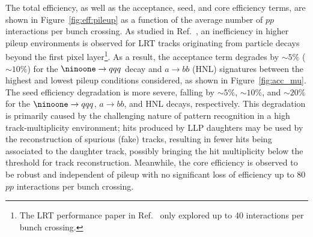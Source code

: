 \documentclass[PUB,UKenglish, texlive=2018]{\ATLASLATEXPATH atlasdoc}
\begin{document}
The total efficiency, as well as the acceptance, seed, and core efficiency terms, are shown in Figure~\ref{fig:eff:pileup} as a function of the average number of $pp$ interactions per bunch crossing.
As studied in Ref.~\cite{ATL-PHYS-PUB-2017-014}, an inefficiency in higher pileup environments is observed for LRT tracks originating from particle decays beyond the first pixel layer\footnote{The 
LRT performance paper in Ref.~\cite{ATL-PHYS-PUB-2017-014} only explored up to 40 interactions per bunch crossing.}.
As a result, the acceptance term degrades by $\sim\!5\%$ ($\sim\!10\%$) for the ${\ninoone} \rightarrow qqq$ decay and $a \rightarrow bb$ (HNL) signatures between the highest and lowest pileup conditions considered, as shown in Figure~\ref{fig:acc_mu}.
The seed efficiency degradation is more severe, falling by $\sim\!5\%$, $\sim\!10\%$, and $\sim\!20\%$ for the ${\ninoone} \rightarrow qqq$, $a \rightarrow bb$, and HNL decays, respectively. 
This degradation is primarily caused by the challenging nature of pattern recognition in a high track-multiplicity environment; hits produced by LLP daughters may be used by the reconstruction of spurious (fake) tracks, resulting in fewer hits being associated to the daughter track, possibly bringing the hit multiplicity below the threshold for track reconstruction. 
Meanwhile, the core efficiency is observed to be robust and independent of pileup with no significant loss of efficiency up to 80 $pp$ interactions per bunch crossing.
\end{document}
